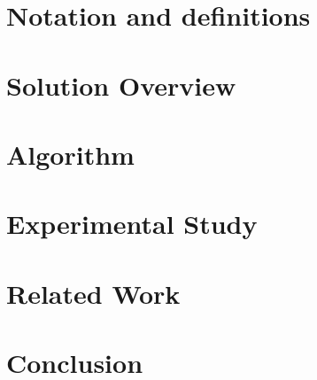 \documentclass{vldb}
\begin{document}
\section{Notation and definitions} \label{sec:notations}


\section{Solution Overview} \label{sec:overview}


\section{Algorithm} \label{sec:algo}


\section{Experimental Study} \label{sec:experiments}

\medskip
\section{Related Work} \label{sec:background}


\section{Conclusion} \label{sec:conc}


\balance


\end{document}

